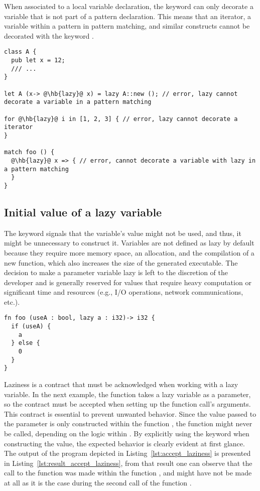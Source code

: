 When associated to a local variable declaration, the keyword  can
only decorate a variable that is not part of a pattern declaration. This means
that an iterator, a variable within a pattern in pattern matching, and similar
constructs cannot be decorated with the keyword .

\begin{lstlisting}[style=coloredverbatim, escapechar=@]
class A {
  pub let x = 12;
  /// ...
}

let A (x-> @\hb{lazy}@ x) = lazy A::new (); // error, lazy cannot decorate a variable in a pattern matching

for @\hb{lazy}@ i in [1, 2, 3] { // error, lazy cannot decorate a iterator
}

match foo () {
  @\hb{lazy}@ x => { // error, cannot decorate a variable with lazy in a pattern matching
  }
}
\end{lstlisting}

\subsection {Initial value of a lazy variable}
\label{sec:lazy_param}

The keyword  signals that the variable's value might not be used,
and thus, it might be unnecessary to construct it. Variables are not defined as
lazy by default because they require more memory space, an allocation, and the
compilation of a new function, which also increases the size of the generated
executable. The decision to make a parameter variable lazy is left to the
discretion of the developer and is generally reserved for values that require
heavy computation or significant time and resources (e.g., I/O operations,
network communications, etc.).

\begin{lstlisting}[style=coloredverbatim]
fn foo (useA : bool, lazy a : i32)-> i32 {
  if (useA) {
    a
  } else {
    0
  }
}
\end{lstlisting}

Laziness is a contract that must be acknowledged when working with a lazy
variable. In the next example, the function  takes a lazy variable as
a parameter, so the contract must be accepted when setting up the function
call's arguments. This contract is essential to prevent unwanted behavior. Since
the value passed to the parameter  is only constructed within the
function , the function  might never be called, depending
on the logic within . By explicitly using the  keyword
when constructing the value, the expected behavior is clearly evident at first
glance. The output of the program depicted in Listing~\ref{lst:accept_laziness}
is presented in Listing~\ref{lst:result_accept_laziness}, from that result one
can observe that the call to the function  was made within the
function , and might have not be made at all as it is the case during
the second call of the function .

